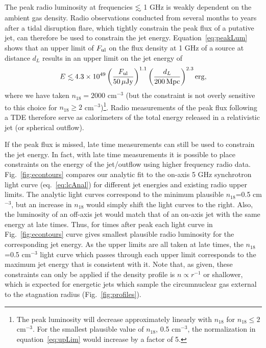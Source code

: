 \documentclass[usenatbib,fleqn]{mnras}
\newcommand\lsim{\mathrel{\rlap{\lower4pt\hbox{\hskip1pt$\sim$}}
    \raise1pt\hbox{$<$}}}
\begin{document}
The peak radio luminosity at frequencies $\lsim$ 1 GHz is weakly
dependent on the ambient gas density. Radio observations conducted
from several months to years after a tidal disruption flare, which
tightly constrain the peak flux of a putative jet, can therefore be
used to constrain the jet energy.  Equation~\eqref{eq:peakLum} shows
that an upper limit of $F_{\rm ul}$ on the flux density at 1 GHz of a
source at distance $d_L$ results in an upper limit on the jet energy
of
\begin{equation}
  E\lsim 4.3 \times 10^{49} \left(\frac{F_{\rm ul}}{50 \,\mu{\rm Jy}}\right)^{1.1}
  \left(\frac{d_L}{200 \,{\rm Mpc}}\right)^{2.3} {\rm erg},
\label{eq:upLim}
\end{equation}
%
where we have taken $n_{18}=2000$ cm$^{-3}$ (but the constraint is not
overly sensitive to this choice for $n_{18}\geq 2$
cm$^{-3}$)\footnote{The peak luminosity will decrease approximately
  linearly with $n_{18}$ for $n_{18}\leq 2$ cm$^{-3}$.  For the
  smallest plausible value of $n_{18}$, 0.5 cm$^{-3}$, the
  normalization in equation~\eqref{eq:upLim} would increase by a
  factor of 5.}.  Radio measurements of the peak flux following a TDE
therefore serve as calorimeters of the total energy released in a
relativistic jet (or spherical outflow).

If the peak flux is missed, late time measurements can still be used
to constrain the jet energy. In fact, with late time measurements it
is possible to place constraints on the energy of the jet/outflow
using higher frequency radio data. Fig.~\ref{fig:econtours} compares
our analytic fit to the on-axis 5 GHz synchrotron light curve
(eq.~\ref{eq:lcAnal}) for different jet energies and existing radio
upper limits. The analytic light curves correspond to the minimum
plausible $n_{18}$=0.5 cm$^{-3}$, but an increase in $n_{18}$ would
simply shift the light curves to the right. Also, the luminosity of an
off-axis jet would match that of an on-axis jet with the same energy
at late times. Thus, for times after peak each light curve in
Fig.~\ref{fig:econtours} curve gives smallest plausible radio
luminosity for the corresponding jet energy. As the upper limits are
all taken at late times, the $n_{18}$=0.5 cm$^{-3}$ light curve which
passes through each upper limit corresponds to the maximum jet energy
that is consistent with it.  Note that, as given, these constraints
can only be applied if the density profile is $n\propto r^{-1}$ or
shallower, which is expected for energetic jets which sample the
circumnuclear gas external to the stagnation radius
(Fig.~\ref{fig:profiles}).
\end{document}
